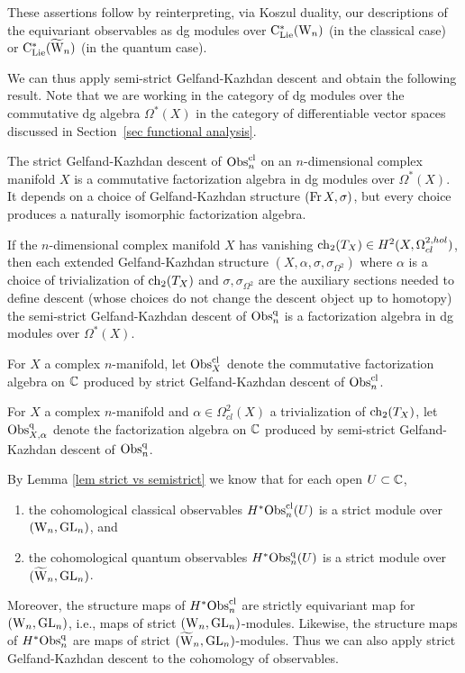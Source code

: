 These assertions follow by reinterpreting, via Koszul duality, 
our descriptions of the equivariant observables as dg modules 
over ${\rm C}_{\rm Lie}^*({{\rm W}_n})$ (in the classical case) or ${\rm C}_{\rm Lie}^*(\widetilde{{{\rm W}}}_n)$ (in the quantum case).

We can thus apply semi-strict Gelfand-Kazhdan descent and obtain the following result.
Note that we are working in the category of dg modules over the commutative dg algebra $\Omega^*(X)$ 
in the category of differentiable vector spaces discussed in Section~\ref{sec functional analysis}.


\begin{cor}
The strict Gelfand-Kazhdan descent of ${\rm Obs}^{\rm cl}_n$ on an $n$-dimensional complex manifold $X$ 
is a commutative factorization algebra in dg modules over $\Omega^*(X)$.
It depends on a choice of Gelfand-Kazhdan structure $({\rm Fr}\, X, \sigma)$,
but every choice produces a naturally isomorphic factorization algebra.

If the $n$-dimensional complex manifold $X$ has vanishing ${\rm ch}_2(T_X)
\in H^2(X, \Omega^{2,hol}_{cl})$, then each extended Gelfand-Kazhdan structure $(X, \alpha, \sigma,
\sigma_{\Omega^2})$ where $\alpha$ is a choice of trivialization of
${\rm ch}_2(T_X)$ and $\sigma,\sigma_{\Omega^2}$ are the auxiliary sections
needed to define descent (whose choices do not change the descent object up to homotopy)
the semi-strict Gelfand-Kazhdan descent of ${\rm Obs}^{\rm q}_n$ is a factorization algebra in dg modules over $\Omega^*(X)$.
\end{cor}

\begin{dfn}
For $X$ a complex $n$-manifold, let ${\rm Obs}^{\rm cl}_X$ denote the commutative factorization algebra on $\mathbb C$ 
produced by strict Gelfand-Kazhdan descent of ${\rm Obs}^{\rm cl}_n$.

For $X$ a complex $n$-manifold and $\alpha \in \Omega^2_{cl}(X)$ a trivialization of ${\rm ch}_2(T_X)$,
let ${\rm Obs}^{\rm q}_{X,\alpha}$ denote the factorization algebra on $\mathbb C$
produced by semi-strict Gelfand-Kazhdan descent of ${\rm Obs}^{\rm q}_n$.
\end{dfn}

By Lemma \ref{lem strict vs semistrict} we know that for each open $U \subset \mathbb C$,
\begin{enumerate}
\item the cohomological classical observables $H^* {\rm Obs}^{\rm cl}_n(U)$ is a strict module over $({{\rm W}_n},{\rm GL}_n)$, and
\item the cohomological quantum observables $H^*{\rm Obs}^{\rm q}_n(U)$ is a strict module over $(\widetilde{{{\rm W}}}_n,{\rm GL}_n)$.
\end{enumerate}
Moreover, the structure maps of $H^*{\rm Obs}^{\rm cl}_n$ are strictly equivariant map for $({{\rm W}_n},{\rm GL}_n)$, 
i.e., maps of strict $({{\rm W}_n},{\rm GL}_n)$-modules.
Likewise, the structure maps of $H^*{\rm Obs}^{\rm q}_n$ are maps of strict $(\widetilde{{{\rm W}}}_n,{\rm GL}_n)$-modules.
Thus we can also apply strict Gelfand-Kazhdan descent to the cohomology of observables.

